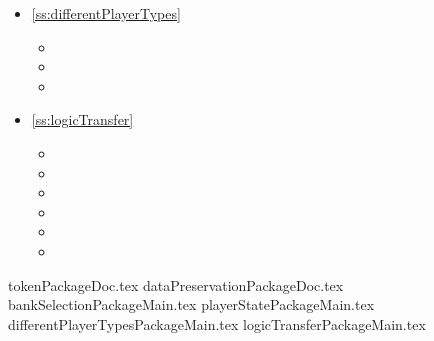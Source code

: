 \begin{multicols}{2}
\begin{itemize}
\begin{minipage}{\linewidth}
\begin{itemize}
		\item {}		
		\item {}	
	\end{itemize}
	\end{minipage}
	\item \ref{ss:differentPlayerTypes} 
	\begin{itemize}
		\item {}
		\item {}
		\item {}
	\end{itemize}
	\item \ref{ss:logicTransfer} 
	\begin{itemize}
		\item {}
		\item {}
		\item {}		
		\item {}
		\item {}		
		\item {}
	\end{itemize}
\end{itemize}
\end{multicols}


{tokenPackageDoc.tex}
\newpage
{dataPreservationPackageDoc.tex}
\newpage
{bankSelectionPackageMain.tex}
\newpage
{playerStatePackageMain.tex}
\newpage
{differentPlayerTypesPackageMain.tex}
\newpage
{logicTransferPackageMain.tex}
